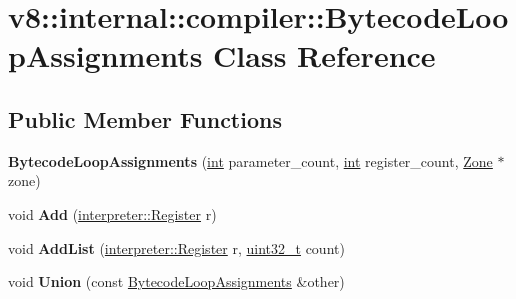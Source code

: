 \hypertarget{classv8_1_1internal_1_1compiler_1_1BytecodeLoopAssignments}{}\section{v8\+:\+:internal\+:\+:compiler\+:\+:Bytecode\+Loop\+Assignments Class Reference}
\label{classv8_1_1internal_1_1compiler_1_1BytecodeLoopAssignments}
\subsection*{Public Member Functions}
\begin{DoxyCompactItemize}
\item 
\mbox{\label{classv8_1_1internal_1_1compiler_1_1BytecodeLoopAssignments_a57eb2fd1cfe4cf64dffd1406250e53b3}} 
{\bfseries Bytecode\+Loop\+Assignments} (\mbox{\hyperlink{classint}{int}} parameter\+\_\+count, \mbox{\hyperlink{classint}{int}} register\+\_\+count, \mbox{\hyperlink{classv8_1_1internal_1_1Zone}{Zone}} $\ast$zone)
\item 
\mbox{\label{classv8_1_1internal_1_1compiler_1_1BytecodeLoopAssignments_a624081f4141d9db4e6e80165dff83204}} 
void {\bfseries Add} (\mbox{\hyperlink{classv8_1_1internal_1_1interpreter_1_1Register}{interpreter\+::\+Register}} r)
\item 
\mbox{\label{classv8_1_1internal_1_1compiler_1_1BytecodeLoopAssignments_afb2dce8d05d8717816f21fa84f16f7d1}} 
void {\bfseries Add\+List} (\mbox{\hyperlink{classv8_1_1internal_1_1interpreter_1_1Register}{interpreter\+::\+Register}} r, \mbox{\hyperlink{classuint32__t}{uint32\+\_\+t}} count)
\item 
\mbox{\label{classv8_1_1internal_1_1compiler_1_1BytecodeLoopAssignments_a0dbd392668ebd96d7878a178b726031a}} 
void {\bfseries Union} (const \mbox{\hyperlink{classv8_1_1internal_1_1compiler_1_1BytecodeLoopAssignments}{Bytecode\+Loop\+Assignments}} \&other)
\item 
\mbox{\label{classv8_1_1internal_1_1compiler_1_1BytecodeLoopAssignments_a0b215bb6affa441114c7078bb862af54}} 

\end{DoxyCompactItemize}
